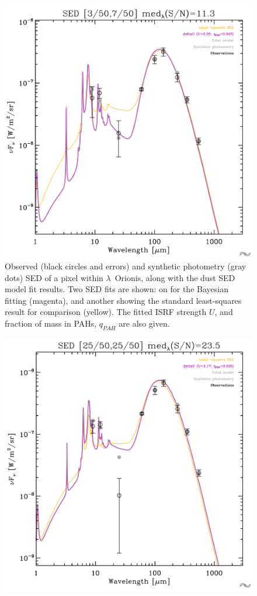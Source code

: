 {\begin{figure}
                \includegraphics[width=\textwidth/2]{../Plots/ch_lori/fred_LOri_notes_Oct2017_fig1a.pdf}
                \centering
                \caption{Observed (black circles and errors) and synthetic photometry (gray dots) SED of a pixel within $\lambda$~Orionis, along with the dust SED model fit results. Two SED fits are shown: on for the Bayesian fitting (magenta), and another showing the standard least-squares result for comparison (yellow). The fitted ISRF strength $U$, and fraction of mass in PAHs, $q_{PAH}$ are also given.}
                \label{fig:fred_LOri_notes_Oct2017_fig1a}
              \end{figure}
              \begin{figure}
                \includegraphics[width=\textwidth/2]{../Plots/ch_lori/fred_LOri_notes_Oct2017_fig1b.pdf}

\end{figure}}
